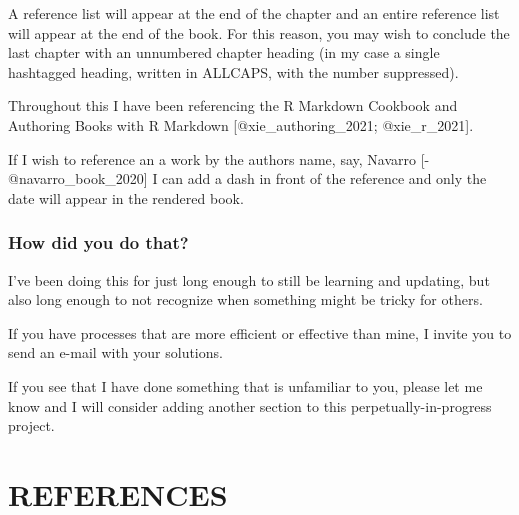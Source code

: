 \documentclass[
]{book}
\newenvironment{Shaded}{\begin{snugshade}}{\end{snugshade}}
\newcommand{\NormalTok}[1]{#1}
\newcommand{\SpecialCharTok}[1]{\textcolor[rgb]{0.00,0.00,0.00}{#1}}
\newcommand{\StringTok}[1]{\textcolor[rgb]{0.31,0.60,0.02}{#1}}
\begin{document}
A reference list will appear at the end of the chapter and an entire reference list will appear at the end of the book. For this reason, you may wish to conclude the last chapter with an unnumbered chapter heading (in my case a single hashtagged heading, written in ALLCAPS, with the number suppressed).

\begin{Shaded}
\begin{Highlighting}[]
\NormalTok{Throughout this I have been referencing the R Markdown Cookbook and Authoring Books with R Markdown [}\SpecialCharTok{@}\NormalTok{xie\_authoring\_2021; }\SpecialCharTok{@}\NormalTok{xie\_r\_2021]. }

\NormalTok{If I wish to reference an a work by the author}\StringTok{\textquotesingle{}s name, say, Navarro [{-}@navarro\_book\_2020] I can add a dash in front of the reference and only the date will appear in the rendered book.}
\end{Highlighting}
\end{Shaded}

\hypertarget{how-did-you-do-that}{%
\subsection{How did you do that?}\label{how-did-you-do-that}}

I've been doing this for just long enough to still be learning and updating, but also long enough to not recognize when something might be tricky for others.

If you have processes that are more efficient or effective than mine, I invite you to send an e-mail with your solutions.

If you see that I have done something that is unfamiliar to you, please let me know and I will consider adding another section to this perpetually-in-progress project.

\hypertarget{references-1}{%
\chapter*{REFERENCES}\label{references-1}}

  
\end{document}
